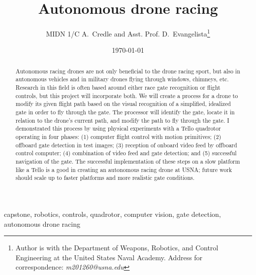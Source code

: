 \documentclass[onecolumn,10pt]{IEEEtran}
\title{Autonomous drone racing}
\author{MIDN 1/C A.~Credle and Asst. Prof. D.~Evangelista\thanks{Author is with the Department of Weapons, Robotics, and Control Engineering at the United States Naval Academy. Address for correspondence: \emph{m201260@usna.edu}}}
\date{\today}
\begin{document}
\maketitlepage
\maketitle

\begin{abstract}
Autonomous racing drones are not only beneficial to the drone racing sport, but also in autonomous vehicles and in military drones flying through windows, chimneys, etc. Research in this field is often based around either race gate recognition or flight controls, but this project will incorporate both. We will create a process for a drone to modify its given flight path based on the visual recognition of a simplified, idealized gate in order to fly through the gate. The processor will identify the gate, locate it in relation to the drone’s current path, and modify the path to fly through the gate. I demonstrated this process by using physical experiments with a Tello quadrotor operating in four phases: (1) computer flight control with motion primitives; (2) offboard gate detection in test images; (3) reception of onboard video feed by offboard control computer; (4) combination of video feed and gate detection; and (5) successful navigation of the gate. The successful implementation of these steps on a slow platform like a Tello is a good in creating an autonomous racing drone at USNA; future work should scale up to faster platforms and more realistic gate conditions.
\end{abstract}

\begin{IEEEkeywords}
capstone, robotics, controls, quadrotor, computer vision, gate detection, autonomous drone racing
\end{IEEEkeywords}


\end{document}
